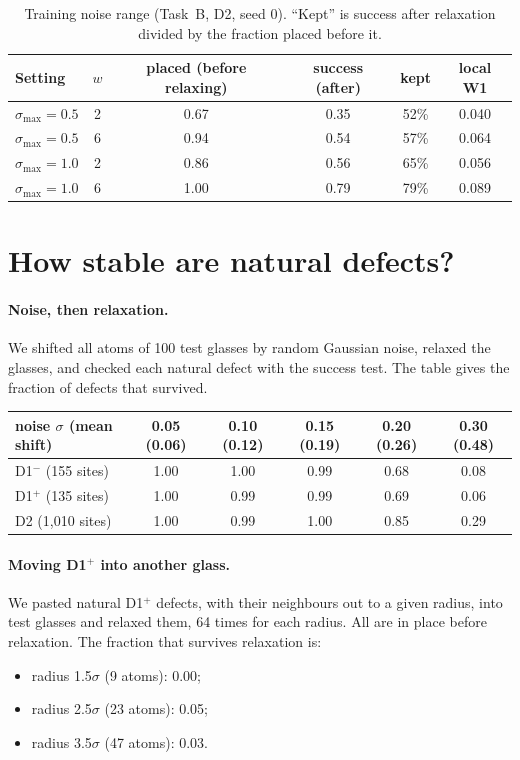 \documentclass[10pt]{article}
\newcommand{\Dm}{D1$^{-}$}
\newcommand{\Dp}{D1$^{+}$}
\begin{document}
\begin{table}[h]
\centering
\caption{Training noise range (Task~B, D2, seed 0). ``Kept'' is success after relaxation divided by the fraction placed before it.}
\label{tab:noise}
\small
\begin{tabular}{lccccc}
\toprule
Setting & $w$ & placed (before relaxing) & success (after) & kept & local W1 \\
\midrule
$\sigma_\text{max}=0.5$ & 2 & 0.67 & 0.35 & 52\% & 0.040 \\
$\sigma_\text{max}=0.5$ & 6 & 0.94 & 0.54 & 57\% & 0.064 \\
$\sigma_\text{max}=1.0$ & 2 & 0.86 & 0.56 & 65\% & 0.056 \\
$\sigma_\text{max}=1.0$ & 6 & 1.00 & 0.79 & 79\% & 0.089 \\
\bottomrule
\end{tabular}
\end{table}

\section{How stable are natural defects?}
\label{app:stability}

\paragraph{Noise, then relaxation.} We shifted all atoms of 100 test glasses by random Gaussian noise, relaxed the glasses, and checked each natural defect with the success test. The table gives the fraction of defects that survived.

\begin{center}\small
\begin{tabular}{lccccc}
\toprule
noise $\sigma$ (mean shift) & 0.05 (0.06) & 0.10 (0.12) & 0.15 (0.19) & 0.20 (0.26) & 0.30 (0.48) \\
\midrule
\Dm{} (155 sites) & 1.00 & 1.00 & 0.99 & 0.68 & 0.08 \\
\Dp{} (135 sites) & 1.00 & 0.99 & 0.99 & 0.69 & 0.06 \\
D2 (1{,}010 sites) & 1.00 & 0.99 & 1.00 & 0.85 & 0.29 \\
\bottomrule
\end{tabular}
\end{center}

\paragraph{Moving \Dp{} into another glass.} We pasted natural \Dp{} defects, with their neighbours out to a given radius, into test glasses and relaxed them, 64 times for each radius. All are in place before relaxation. The fraction that survives relaxation is:
\begin{itemize}
\item radius 1.5$\sigma$ (9 atoms): 0.00;
\item radius 2.5$\sigma$ (23 atoms): 0.05;
\item radius 3.5$\sigma$ (47 atoms): 0.03.
\end{itemize}
\end{document}

